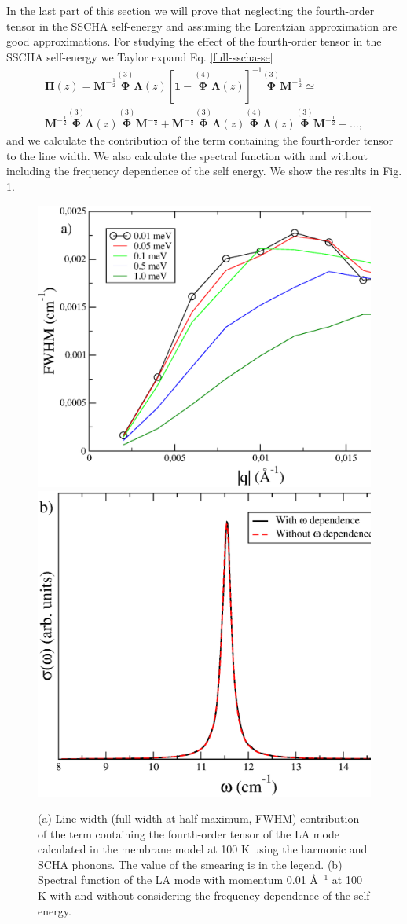 In the last part of this section we will prove that neglecting the fourth-order tensor in the SSCHA self-energy and 
assuming the Lorentzian approximation are good approximations. For studying the effect of the fourth-order tensor 
in the SSCHA self-energy we Taylor expand Eq. \ref{full-sscha-se}
\begin{multline}
 \boldsymbol{\Pi}(z)=\mathbf{M}^{-\frac{1}{2}}\overset{(3)}{\mathbf{\Phi}}\mathbf{\Lambda}(z)[\mathbf{1}-\overset{(4)}{\mathbf{\Phi}}\mathbf{\Lambda}(z)]^{-1}
 \overset{(3)}{\mathbf{\Phi}}\mathbf{M}^{-\frac{1}{2}}\simeq\\\mathbf{M}^{-\frac{1}{2}}\overset{(3)}{\mathbf{\Phi}}\mathbf{\Lambda}(z)\overset{(3)}{\mathbf{\Phi}}\mathbf{M}^{-\frac{1}{2}}+\mathbf{M}^{-\frac{1}{2}}\overset{(3)}{\mathbf{\Phi}}\mathbf{\Lambda}(z)\overset{(4)}{\mathbf{\Phi}}\mathbf{\Lambda}(z)\overset{(3)}{\mathbf{\Phi}}\mathbf{M}^{-\frac{1}{2}}+\dots,
\end{multline}
and we calculate the contribution of the term containing the fourth-order tensor to the line width. We also calculate 
the spectral function with and without including the frequency dependence of the self energy. We show the results in 
Fig. \ref{lw_membrane}.
\begin{figure}[ht]
\includegraphics[width=0.49\linewidth]{Figures/v4-membrane.eps}
\includegraphics[width=0.45\linewidth]{Figures/spf-lorentzian-membrane.eps}
	\caption[Fourth-order term contribution to the line width in graphene. Spectral function within the 
	Lorentzian and non-Lorentzian approximations]{(a) Line width (full width at half maximum, FWHM) contribution 
	of the term containing the fourth-order tensor of the LA mode calculated in the membrane model at 100 K using 
	the harmonic and SCHA phonons. The value of the smearing is in the legend. (b) Spectral function of the LA 
	mode with momentum 0.01 \AA$^{-1}$ at 100 K with and without considering the frequency dependence of the 
	self energy.}
\label{lw_membrane}
\end{figure}
